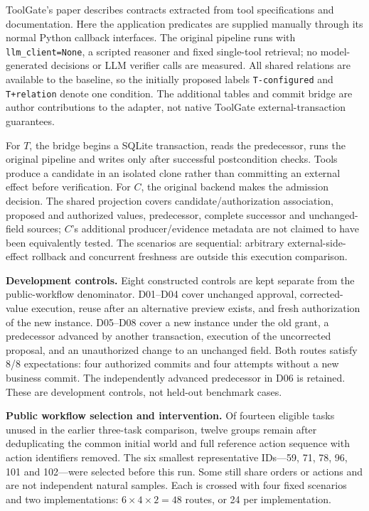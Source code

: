 \documentclass[10pt,a4paper]{article}
\begin{document}
ToolGate's paper describes contracts extracted from tool specifications and documentation. Here the application predicates are supplied manually through its normal Python callback interfaces. The original pipeline runs with \texttt{llm\_client=None}, a scripted reasoner and fixed single-tool retrieval; no model-generated decisions or LLM verifier calls are measured. All shared relations are available to the baseline, so the initially proposed labels \texttt{T-configured} and \texttt{T+relation} denote one condition. The additional tables and commit bridge are author contributions to the adapter, not native ToolGate external-transaction guarantees.

For $T$, the bridge begins a SQLite transaction, reads the predecessor, runs the original pipeline and writes only after successful postcondition checks. Tools produce a candidate in an isolated clone rather than committing an external effect before verification. For $C$, the original backend makes the admission decision. The shared projection covers candidate/authorization association, proposed and authorized values, predecessor, complete successor and unchanged-field sources; $C$'s additional producer/evidence metadata are not claimed to have been equivalently tested. The scenarios are sequential: arbitrary external-side-effect rollback and concurrent freshness are outside this execution comparison.

\textbf{Development controls.}
Eight constructed controls are kept separate from the public-workflow denominator. D01--D04 cover unchanged approval, corrected-value execution, reuse after an alternative preview exists, and fresh authorization of the new instance. D05--D08 cover a new instance under the old grant, a predecessor advanced by another transaction, execution of the uncorrected proposal, and an unauthorized change to an unchanged field. Both routes satisfy 8/8 expectations: four authorized commits and four attempts without a new business commit. The independently advanced predecessor in D06 is retained. These are development controls, not held-out benchmark cases.

\textbf{Public workflow selection and intervention.}
Of fourteen eligible tasks unused in the earlier three-task comparison, twelve groups remain after deduplicating the common initial world and full reference action sequence with action identifiers removed. The six smallest representative IDs---59, 71, 78, 96, 101 and 102---were selected before this run. Some still share orders or actions and are not independent natural samples. Each is crossed with four fixed scenarios and two implementations: $6\times4\times2=48$ routes, or 24 per implementation.
\end{document}
